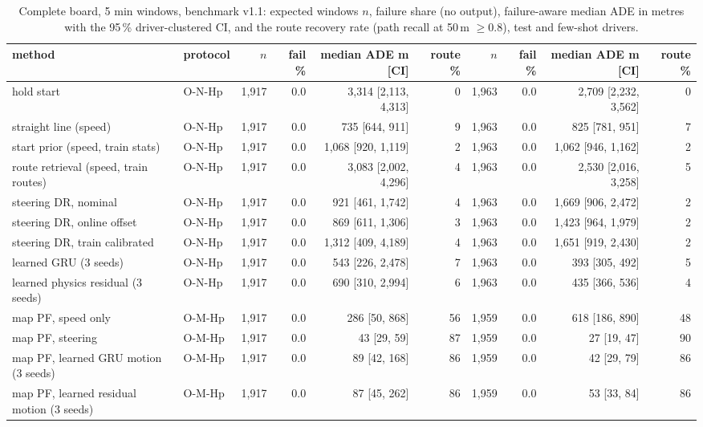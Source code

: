 \begin{table}[t]\centering\scriptsize\setlength{\tabcolsep}{3pt}
\caption{Complete board, 5 min windows, benchmark v1.1: expected windows $n$, failure share (no output), failure-aware median ADE in metres with the 95\,\% driver-clustered CI, and the route recovery rate (path recall at 50\,m $\ge 0.8$), test and few-shot drivers.}\label{tab:supp_main_w05}
\begin{tabular}{llrrrrrrrr}\toprule
method & protocol & $n$ & fail \% & median ADE m [CI] & route \% & $n$ & fail \% & median ADE m [CI] & route \% \\\midrule
hold start & O-N-Hp & 1{,}917 & 0.0 & 3{,}314 [2{,}113, 4{,}313] & 0 & 1{,}963 & 0.0 & 2{,}709 [2{,}232, 3{,}562] & 0 \\
straight line (speed) & O-N-Hp & 1{,}917 & 0.0 & 735 [644, 911] & 9 & 1{,}963 & 0.0 & 825 [781, 951] & 7 \\
start prior (speed, train stats) & O-N-Hp & 1{,}917 & 0.0 & 1{,}068 [920, 1{,}119] & 2 & 1{,}963 & 0.0 & 1{,}062 [946, 1{,}162] & 2 \\
route retrieval (speed, train routes) & O-N-Hp & 1{,}917 & 0.0 & 3{,}083 [2{,}002, 4{,}296] & 4 & 1{,}963 & 0.0 & 2{,}530 [2{,}016, 3{,}258] & 5 \\
steering DR, nominal & O-N-Hp & 1{,}917 & 0.0 & 921 [461, 1{,}742] & 4 & 1{,}963 & 0.0 & 1{,}669 [906, 2{,}472] & 2 \\
steering DR, online offset & O-N-Hp & 1{,}917 & 0.0 & 869 [611, 1{,}306] & 3 & 1{,}963 & 0.0 & 1{,}423 [964, 1{,}979] & 2 \\
steering DR, train calibrated & O-N-Hp & 1{,}917 & 0.0 & 1{,}312 [409, 4{,}189] & 4 & 1{,}963 & 0.0 & 1{,}651 [919, 2{,}430] & 2 \\
learned GRU (3 seeds) & O-N-Hp & 1{,}917 & 0.0 & 543 [226, 2{,}478] & 7 & 1{,}963 & 0.0 & 393 [305, 492] & 5 \\
learned physics residual (3 seeds) & O-N-Hp & 1{,}917 & 0.0 & 690 [310, 2{,}994] & 6 & 1{,}963 & 0.0 & 435 [366, 536] & 4 \\
map PF, speed only & O-M-Hp & 1{,}917 & 0.0 & 286 [50, 868] & 56 & 1{,}959 & 0.0 & 618 [186, 890] & 48 \\
map PF, steering & O-M-Hp & 1{,}917 & 0.0 & 43 [29, 59] & 87 & 1{,}959 & 0.0 & 27 [19, 47] & 90 \\
map PF, learned GRU motion (3 seeds) & O-M-Hp & 1{,}917 & 0.0 & 89 [42, 168] & 86 & 1{,}959 & 0.0 & 42 [29, 79] & 86 \\
map PF, learned residual motion (3 seeds) & O-M-Hp & 1{,}917 & 0.0 & 87 [45, 262] & 86 & 1{,}959 & 0.0 & 53 [33, 84] & 86 \\

\end{tabular}
\end{table}
